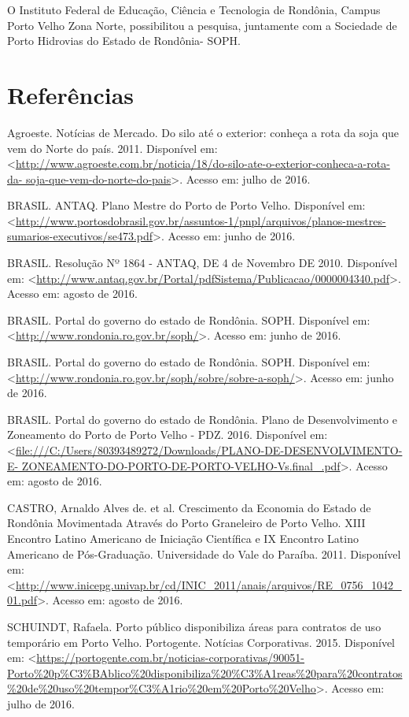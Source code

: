 \documentclass[article,12pt,onesidea,4paper,english,brazil]{abntex2}
\begin{document}
	O Instituto Federal de Educação, Ciência e Tecnologia de Rondônia, Campus Porto Velho Zona Norte, possibilitou a pesquisa, juntamente com a Sociedade de Porto Hidrovias do Estado de Rondônia- SOPH.
	
	\section*{Referências}
	
	\sloppy
	
\noindent Agroeste. Notícias de Mercado. Do silo até o exterior: conheça a rota da soja que vem do Norte do país. 2011. Disponível em:
<\url{http://www.agroeste.com.br/noticia/18/do-silo-ate-o-exterior-conheca-a-rota-da- soja-que-vem-do-norte-do-pais}>. Acesso em: julho de 2016.

\noindent BRASIL. ANTAQ. Plano Mestre do Porto de Porto Velho. Disponível em:
<\url{http://www.portosdobrasil.gov.br/assuntos-1/pnpl/arquivos/planos-mestres- sumarios-executivos/se473.pdf}>. Acesso em: junho de 2016.

\noindent BRASIL. Resolução Nº 1864 - ANTAQ, DE 4 de Novembro DE 2010. Disponível em:
<\url{http://www.antaq.gov.br/Portal/pdfSistema/Publicacao/0000004340.pdf}>. Acesso em: agosto de 2016.

\noindent BRASIL. Portal do governo do estado de Rondônia. SOPH. Disponível em:
<\url{http://www.rondonia.ro.gov.br/soph/}>. Acesso em: junho de 2016.

\noindent BRASIL. Portal do governo do estado de Rondônia. SOPH. Disponível em:
<\url{http://www.rondonia.ro.gov.br/soph/sobre/sobre-a-soph/}>. Acesso em: junho de 2016.

\noindent BRASIL. Portal do governo do estado de Rondônia. Plano de Desenvolvimento e Zoneamento do Porto de Porto Velho - PDZ. 2016. Disponível em:
<\url{file:///C:/Users/80393489272/Downloads/PLANO-DE-DESENVOLVIMENTO-E- ZONEAMENTO-DO-PORTO-DE-PORTO-VELHO-Vs.final\_.pdf}>. Acesso em: agosto de 2016.


\noindent CASTRO, Arnaldo Alves de. et al. Crescimento da Economia do Estado de Rondônia Movimentada Através do Porto Graneleiro de Porto Velho. XIII Encontro Latino Americano de Iniciação Científica e IX Encontro Latino Americano de Pós-Graduação. Universidade do Vale do Paraíba. 2011. Disponível em:
<\url{http://www.inicepg.univap.br/cd/INIC\_2011/anais/arquivos/RE\_0756\_1042\_01.pdf}>. Acesso em: agosto de 2016.

\noindent SCHUINDT, Rafaela. Porto público disponibiliza áreas para contratos de uso temporário em Porto Velho. Portogente. Notícias Corporativas. 2015. Disponível em: <\url{https://portogente.com.br/noticias-corporativas/90051- Porto\%20p\%C3\%BAblico\%20disponibiliza\%20\%C3\%A1reas\%20para\%20contratos
\%20de\%20uso\%20tempor\%C3\%A1rio\%20em\%20Porto\%20Velho}>. Acesso em: julho de 2016.
	
\end{document}
